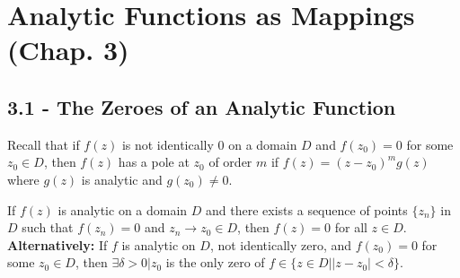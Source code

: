 \section{Analytic Functions as Mappings (Chap. 3)}

\subsection{3.1 - The Zeroes of an Analytic Function}

\begin{lemma}
    Recall that if $f(z)$ is not identically $0$ on a domain $D$ and $f(z_0) = 0$ for some $z_0 \in D$, then $f(z)$ has a pole at $z_0$ of order $m$ if $f(z) = (z - z_0)^m g(z)$ where $g(z)$ is analytic and $g(z_0) \neq 0$.
\end{lemma}

\begin{proposition}
    If $f(z)$ is analytic on a domain $D$ and there exists a sequence of points $\{z_n\}$ in $D$ such that $f(z_n) = 0$ and $z_n \to z_0 \in D$, then $f(z) = 0$ for all $z \in D$.
    \textbf{Alternatively:}
    If $f$ is analytic on $D$, not identically zero, and $f(z_0) = 0$ for some $z_0 \in D$, then $\exists \delta > 0 | z_0$ is the only zero of $f \in \{z \in D | |z - z_0| < \delta\}$.
\end{proposition}

